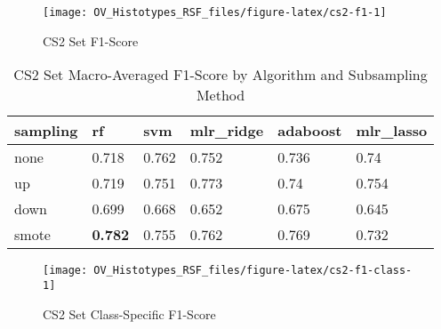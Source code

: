 \documentclass[
]{report}
\begin{document}
\begin{figure}[H]

{\centering \texttt{[image: OV\_Histotypes\_RSF\_files/figure-latex/cs2-f1-1]} 

}

\caption{CS2 Set F1-Score}\label{fig:cs2-f1}
\end{figure}

\begin{table}

\caption{\label{tab:cs2-f1-table}CS2 Set Macro-Averaged F1-Score by Algorithm and Subsampling Method}
\centering
\begin{tabular}[t]{l|l|l|l|l|l}
\hline
sampling & rf & svm & mlr\_ridge & adaboost & mlr\_lasso\\
\hline
none & 0.718 & 0.762 & 0.752 & 0.736 & 0.74\\
\hline
up & 0.719 & 0.751 & 0.773 & 0.74 & 0.754\\
\hline
down & 0.699 & 0.668 & 0.652 & 0.675 & 0.645\\
\hline
smote & \textbf{0.782} & 0.755 & 0.762 & 0.769 & 0.732\\
\hline
\end{tabular}
\end{table}

\begin{figure}[H]

{\centering \texttt{[image: OV\_Histotypes\_RSF\_files/figure-latex/cs2-f1-class-1]} 

}

\caption{CS2 Set Class-Specific F1-Score}\label{fig:cs2-f1-class}
\end{figure}
\end{document}
